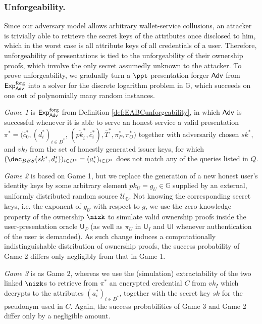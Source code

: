 \subsubsection{Unforgeability.}
Since our adversary model allows arbitrary wallet-service collusions, an attacker is trivially able to retrieve the secret keys of the attributes once disclosed to him, which in the worst case is all attribute keys of all  credentials of a user.
Therefore, unforgeability of presentations is tied to the unforgeability of their ownership proofs, which involve the only secret assumedly unknown to the attacker.
To prove unforgeability, we gradually turn a $\ppt$ presentation forger $\mathsf{Adv}$ from $\operatorname{\mathsf{Exp}_{\mathsf{Adv}}^{forg}}$ into a solver for the discrete logarithm problem in $\mathbb G$, which succeeds on one out of polynomially many random instances.

\begin{description}
\item
\emph{Game 1}
is  $\operatorname{\mathsf{Exp}_{\mathsf{Adv}}^{forg}}$ from Definition \ref{def:EABCunforgeability}, 
in which $\mathsf{Adv}$ is successful whenever it is able to serve an honest service a valid presentation $\pi^*=(\overline c_0^*,(d_i^*)_{i\in D^*}$, $(\overline{pk}_i^*,\overline c_i^*), \overline T^*, \pi_P^*, \pi_O^*)$ together with adversarily chosen  $sk^*$, and $vk_I$ from the set of honestly generated issuer keys, for which  $(\dec_{BBS}(sk^*, d_i^*))_{i\in D^*}= (a_i^*)_{i\in D^*}$ does not match any of the queries listed in $Q$.

\item
\emph{Game 2}
is based on Game 1, but we replace the generation of a new honest user's identity keys  by some arbitrary element $pk_U= g_U\in \mathbb G$  supplied by an external, uniformly distributed random source $\mathcal U_{\mathbb G}$.
Not knowing the corresponding secret keys, i.e. the exponent of $g_U$ with respect to $g$, we use the zero-knowledge property of the ownership $\nizk$ to  simulate valid ownership proofs inside the user-presentation oracle  $\mathsf{U}_P$ (as well as $\pi_U$ in  $\mathsf{U}_I$ and $\mathsf{UI}$ whenever authentication of the user is demanded). 
As such change induces a computationally indistinguishable distribution of ownership proofs, the success probability of Game 2 differs only negligibly from that in Game 1.

\item
\emph{Game 3}
is as Game 2, whereas we use the (simulation) extractability of the two linked $\nizk$s to retrieve from  $\pi^*$ an encrypted credential $C$ from $vk_I$ which decrypts to the attributes $(a_i^*)_{i\in D^*}$,  together with the secret key $sk$ for the pseudonym used in $C$.
Again, the success probabilities of Game 3 and Game 2 differ only by a negligible amount. 
\end{description}

